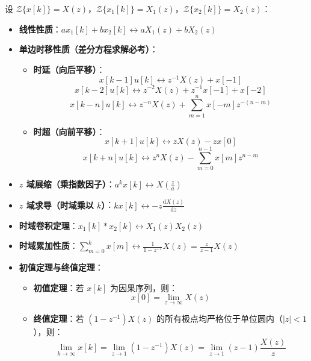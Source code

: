 \documentclass[11pt,a4paper,fontset=fandol]{ctexart}
\theoremstyle{remark}
\begin{document}
设 $\mathcal{Z}\{x[k]\} = X(z)$，$\mathcal{Z}\{x_1[k]\} = X_1(z)$，$\mathcal{Z}\{x_2[k]\} = X_2(z)$：
\begin{itemize}
    \item \textbf{线性性质}：$a x_1[k] + b x_2[k] \longleftrightarrow a X_1(z) + b X_2(z)$
    \item \textbf{单边时移性质（差分方程求解必考）}：
    \begin{itemize}
        \item \textbf{时延（向后平移）}：
        \begin{equation}
            x[k - 1]u[k] \longleftrightarrow z^{-1}X(z) + x[-1]
        \end{equation}
        \begin{equation}
            x[k - 2]u[k] \longleftrightarrow z^{-2}X(z) + z^{-1}x[-1] + x[-2]
        \end{equation}
        \begin{equation}
            x[k - n]u[k] \longleftrightarrow z^{-n}X(z) + \sum_{m=1}^n x[-m] z^{-(n - m)}
        \end{equation}
        \item \textbf{时超（向前平移）}：
        \begin{equation}
            x[k + 1]u[k] \longleftrightarrow z X(z) - z x[0]
        \end{equation}
        \begin{equation}
            x[k + n]u[k] \longleftrightarrow z^n X(z) - \sum_{m=0}^{n-1} x[m] z^{n - m}
        \end{equation}
    \end{itemize}
    \item \textbf{$z$ 域展缩（乘指数因子）}：$a^k x[k] \longleftrightarrow X\left(\frac{z}{a}\right)$
    \item \textbf{$z$ 域求导（时域乘以 $k$）}：$k x[k] \longleftrightarrow -z \frac{\mathrm{d}X(z)}{\mathrm{d}z}$
    \item \textbf{时域卷积定理}：$x_1[k] * x_2[k] \longleftrightarrow X_1(z) X_2(z)$
    \item \textbf{时域累加性质}：$\sum_{m=0}^k x[m] \longleftrightarrow \frac{1}{1 - z^{-1}}X(z) = \frac{z}{z - 1}X(z)$
    \item \textbf{初值定理与终值定理}：
    \begin{itemize}
        \item \textbf{初值定理}：若 $x[k]$ 为因果序列，则：
        \begin{equation}
            x[0] = \lim_{z \to \infty} X(z)
        \end{equation}
        \item \textbf{终值定理}：若 $(1 - z^{-1})X(z)$ 的所有极点均严格位于单位圆内（$|z| < 1$），则：
        \begin{equation}
            \lim_{k \to \infty} x[k] = \lim_{z \to 1} (1 - z^{-1})X(z) = \lim_{z \to 1} (z - 1)\frac{X(z)}{z}
        \end{equation}
    \end{itemize}
\end{itemize}
\end{document}
